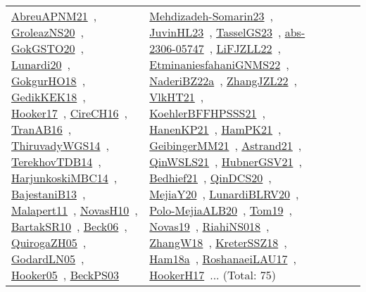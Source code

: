 {\begin{longtable}{lp{3cm}>{\raggedright\arraybackslash}p{6cm}>{\raggedright\arraybackslash}p{6cm}>{\raggedright\arraybackslash}p{8cm}}
\href{../works/AbreuAPNM21.pdf}{AbreuAPNM21}~\cite{AbreuAPNM21}, \href{../works/GroleazNS20.pdf}{GroleazNS20}~\cite{GroleazNS20}, \href{../works/GokGSTO20.pdf}{GokGSTO20}~\cite{GokGSTO20}, \href{../works/Lunardi20.pdf}{Lunardi20}~\cite{Lunardi20}, \href{../works/GokgurHO18.pdf}{GokgurHO18}~\cite{GokgurHO18}, \href{../works/GedikKEK18.pdf}{GedikKEK18}~\cite{GedikKEK18}, \href{../works/Hooker17.pdf}{Hooker17}~\cite{Hooker17}, \href{../works/CireCH16.pdf}{CireCH16}~\cite{CireCH16}, \href{../works/TranAB16.pdf}{TranAB16}~\cite{TranAB16}, \href{../works/ThiruvadyWGS14.pdf}{ThiruvadyWGS14}~\cite{ThiruvadyWGS14}, \href{../works/TerekhovTDB14.pdf}{TerekhovTDB14}~\cite{TerekhovTDB14}, \href{../works/HarjunkoskiMBC14.pdf}{HarjunkoskiMBC14}~\cite{HarjunkoskiMBC14}, \href{../works/BajestaniB13.pdf}{BajestaniB13}~\cite{BajestaniB13}, \href{../works/Malapert11.pdf}{Malapert11}~\cite{Malapert11}, \href{../works/NovasH10.pdf}{NovasH10}~\cite{NovasH10}, \href{../works/BartakSR10.pdf}{BartakSR10}~\cite{BartakSR10}, \href{../works/Beck06.pdf}{Beck06}~\cite{Beck06}, \href{../works/QuirogaZH05.pdf}{QuirogaZH05}~\cite{QuirogaZH05}, \href{../works/GodardLN05.pdf}{GodardLN05}~\cite{GodardLN05}, \href{../works/Hooker05.pdf}{Hooker05}~\cite{Hooker05}, \href{../works/BeckPS03.pdf}{BeckPS03}~\cite{BeckPS03} & \href{../works/Mehdizadeh-Somarin23.pdf}{Mehdizadeh-Somarin23}~\cite{Mehdizadeh-Somarin23}, \href{../works/JuvinHL23.pdf}{JuvinHL23}~\cite{JuvinHL23}, \href{../works/TasselGS23.pdf}{TasselGS23}~\cite{TasselGS23}, \href{../works/abs-2306-05747.pdf}{abs-2306-05747}~\cite{abs-2306-05747}, \href{../works/LiFJZLL22.pdf}{LiFJZLL22}~\cite{LiFJZLL22}, \href{../works/EtminaniesfahaniGNMS22.pdf}{EtminaniesfahaniGNMS22}~\cite{EtminaniesfahaniGNMS22}, \href{../works/NaderiBZ22a.pdf}{NaderiBZ22a}~\cite{NaderiBZ22a}, \href{../works/ZhangJZL22.pdf}{ZhangJZL22}~\cite{ZhangJZL22}, \href{../works/VlkHT21.pdf}{VlkHT21}~\cite{VlkHT21}, \href{../works/KoehlerBFFHPSSS21.pdf}{KoehlerBFFHPSSS21}~\cite{KoehlerBFFHPSSS21}, \href{../works/HanenKP21.pdf}{HanenKP21}~\cite{HanenKP21}, \href{../works/HamPK21.pdf}{HamPK21}~\cite{HamPK21}, \href{../works/GeibingerMM21.pdf}{GeibingerMM21}~\cite{GeibingerMM21}, \href{../works/Astrand21.pdf}{Astrand21}~\cite{Astrand21}, \href{../works/QinWSLS21.pdf}{QinWSLS21}~\cite{QinWSLS21}, \href{../works/HubnerGSV21.pdf}{HubnerGSV21}~\cite{HubnerGSV21}, \href{../works/Bedhief21.pdf}{Bedhief21}~\cite{Bedhief21}, \href{../works/QinDCS20.pdf}{QinDCS20}~\cite{QinDCS20}, \href{../works/MejiaY20.pdf}{MejiaY20}~\cite{MejiaY20}, \href{../works/LunardiBLRV20.pdf}{LunardiBLRV20}~\cite{LunardiBLRV20}, \href{../works/Polo-MejiaALB20.pdf}{Polo-MejiaALB20}~\cite{Polo-MejiaALB20}, \href{../works/Tom19.pdf}{Tom19}~\cite{Tom19}, \href{../works/Novas19.pdf}{Novas19}~\cite{Novas19}, \href{../works/RiahiNS018.pdf}{RiahiNS018}~\cite{RiahiNS018}, \href{../works/ZhangW18.pdf}{ZhangW18}~\cite{ZhangW18}, \href{../works/KreterSSZ18.pdf}{KreterSSZ18}~\cite{KreterSSZ18}, \href{../works/Ham18a.pdf}{Ham18a}~\cite{Ham18a}, \href{../works/RoshanaeiLAU17.pdf}{RoshanaeiLAU17}~\cite{RoshanaeiLAU17}, \href{../works/HookerH17.pdf}{HookerH17}~\cite{HookerH17}... (Total: 75)\\

\end{longtable}}
